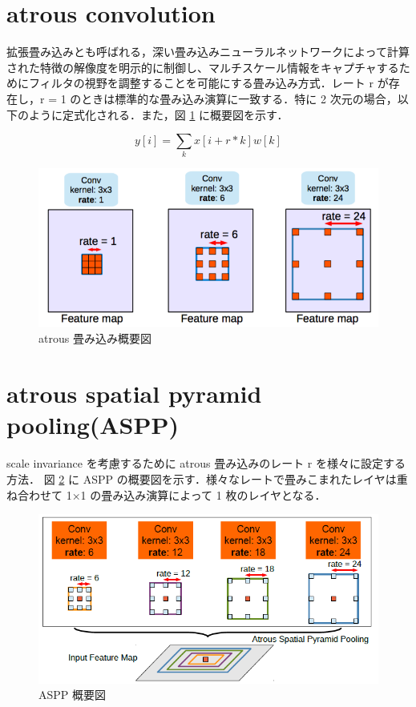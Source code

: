 \documentclass[onecolumn]{ujarticle}   %
\begin{document}
	\section{atrous convolution}
	拡張畳み込みとも呼ばれる，深い畳み込みニューラルネットワークによって計算された特徴の解像度を明示的に制御し、マルチスケール情報をキャプチャするためにフィルタの視野を調整することを可能にする畳み込み方式．レート r が存在し，r = 1 のときは標準的な畳み込み演算に一致する．特に 2 次元の場合，以下のように定式化される．また，図 \ref{fig:atrous} に概要図を示す．
	
	\begin{equation}
	y[i] = \sum_{k}x[i+r*k]w[k]
	\end{equation}
	
	\begin{figure}[h]
		\begin{center}
			\includegraphics[width=120mm]{atrous.png}
			\caption{atrous 畳み込み概要図}
			\label{fig:atrous}
		\end{center}
	\end{figure}

	\section{atrous spatial pyramid pooling(ASPP)}
	scale invariance を考慮するために atrous 畳み込みのレート r を様々に設定する方法．
	図 \ref{fig:aspp} に ASPP の概要図を示す．様々なレートで畳みこまれたレイヤは重ね合わせて 1×1 の畳み込み演算によって 1 枚のレイヤとなる．
	
	\begin{figure}[h]
		\begin{center}
			\includegraphics[width=120mm]{aspp.png}
			\caption{ASPP 概要図}
			\label{fig:aspp}
		\end{center}
	\end{figure}
\end{document}

